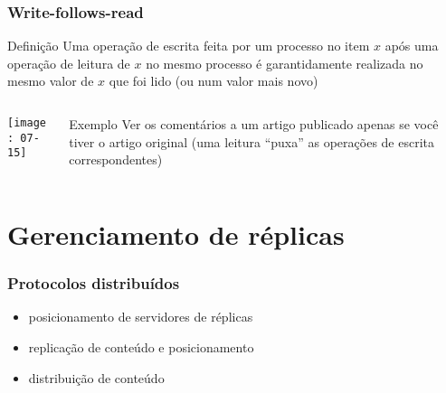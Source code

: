 \documentclass[Ligatures=TeX,table,brazil,svgnames,usetotalslideindicator,compress,10pt]{beamer}
\begin{document}
\begin{frame}
  \frametitle{Write-follows-read}
  \begin{block}{Definição}
    Uma operação de escrita feita por um processo no item $x$ após uma operação de leitura de $x$ no mesmo processo é garantidamente realizada no mesmo valor de $x$ que foi lido (ou num valor mais novo)
  \end{block}

  \qquad

  \begin{columns}

    \begin{column}{0.6\textwidth}

      \texttt{[image: 07-15]}

    \end{column}

    \begin{column}{0.4\textwidth}

      \pause

      \begin{exampleblock}{Exemplo}
        Ver os comentários a um artigo publicado apenas se você tiver o artigo original (uma leitura ``puxa'' as operações de escrita correspondentes)
      \end{exampleblock}

    \end{column}

  \end{columns}


\end{frame}

\section{Gerenciamento de réplicas}

\begin{frame}
  \frametitle{Protocolos distribuídos}
  \begin{itemize}
  \item posicionamento de servidores de réplicas
  \item replicação de conteúdo e posicionamento
  \item distribuição de conteúdo
  \end{itemize}
\end{frame}
\end{document}
